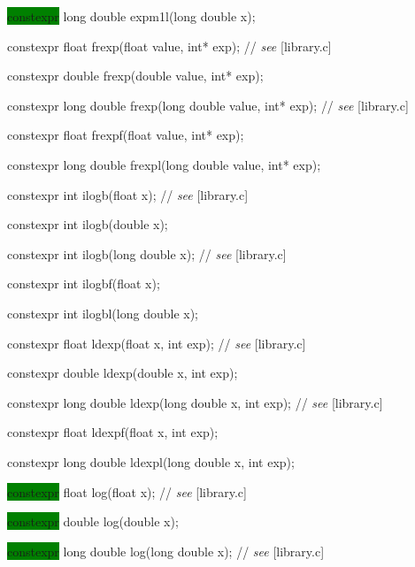 \documentclass[prd,twocolumn,amsmath,amssymb,nofootinbib,eqsecnum]{revtex4-1}
\newcommand{\highlight}[1]{\colorbox{green}{\!\!\!\! #1}}
\newcommand{\oldhighlight}[1]{#1}
\newcommand{\stdcomment}[1]{{// {\it see} [#1]}}
\begin{document}
{\highlight{constexpr} long double expm1l(long double x);

\vspace{2ex}


\oldhighlight{constexpr}  float frexp(float value, int* exp); \stdcomment{library.c}

\oldhighlight{constexpr}  double frexp(double value, int* exp);

\oldhighlight{constexpr}  long double frexp(long double value, int* exp); \stdcomment{library.c}

\oldhighlight{constexpr}  float frexpf(float value, int* exp);

\oldhighlight{constexpr}  long double frexpl(long double value, int* exp);

\vspace{2ex}


\oldhighlight{constexpr} int ilogb(float x); \stdcomment{library.c}

\oldhighlight{constexpr} int ilogb(double x);

\oldhighlight{constexpr} int ilogb(long double x); \stdcomment{library.c}

\oldhighlight{constexpr} int ilogbf(float x);

\oldhighlight{constexpr} int ilogbl(long double x);

\vspace{2ex}


\oldhighlight{constexpr} float ldexp(float x, int exp); \stdcomment{library.c}

\oldhighlight{constexpr} double ldexp(double x, int exp);

\oldhighlight{constexpr} long double ldexp(long double x, int exp); \stdcomment{library.c}

\oldhighlight{constexpr} float ldexpf(float x, int exp);

\oldhighlight{constexpr} long double ldexpl(long double x, int exp);

\vspace{2ex}


\highlight{constexpr} float log(float x); \stdcomment{library.c}

\highlight{constexpr} double log(double x);

\highlight{constexpr} long double log(long double x); \stdcomment{library.c}

}
\end{document}
